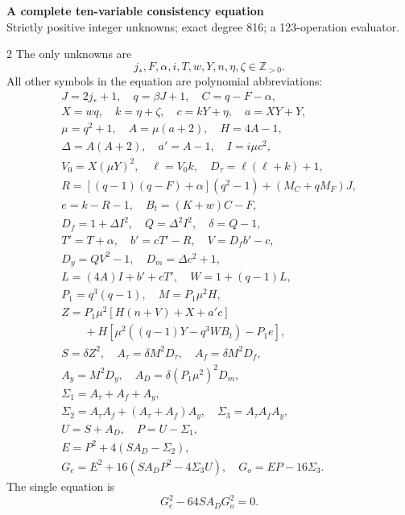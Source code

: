 \documentclass[10pt]{article}
\begin{document}
\begin{center}
{\large\bfseries A complete ten-variable consistency equation}\\[-1pt]
{\small Strictly positive integer unknowns; exact degree 816; a 123-operation evaluator.}
\end{center}\vspace{-8pt}
\begin{multicols}{2}
\fontsize{9}{9.5}\selectfont
The only unknowns are
\[
j_*,F,\alpha,i,T,w,Y,n,\eta,\zeta\in\mathbb Z_{>0}.
\]
All other symbols in the equation are polynomial abbreviations:
\[
\begin{gathered}
J=2j_*+1,\quad q=\beta J+1,\quad C=q-F-\alpha,\\
X=wq,\quad k=\eta+\zeta,\quad c=kY+\eta,\quad a=XY+Y,\\
\mu=q^2+1,\quad A=\mu(a+2),\quad H=4A-1,\\
\Delta=A(A+2),\quad a'=A-1,\quad I=i\mu c^2,\\
V_0=X(\mu Y)^2,\quad\ell=V_0k,\quad D_\tau=\ell(\ell+k)+1,\\
R=[(q-1)(q-F)+\alpha](q^2-1)+(M_C+qM_F)J,\\
e=k-R-1,\quad B_t=(K+w)C-F,\\
D_f=1+\Delta I^2,\quad Q=\Delta^2I^2,\quad\delta=Q-1,\\
T'=T+\alpha,\quad b'=cT'-R,\quad V=D_fb'-c,\\
D_y=QV^2-1,\quad D_m=\Delta c^2+1,\\
L=(4A)I+b'+cT',\quad W=1+(q-1)L,\\
P_1=q^3(q-1),\quad M=P_1\mu^2H,\\
Z=P_1\mu^2[H(n+V)+X+a'c]\\
\qquad+H[\mu^2((q-1)Y-q^3WB_t)-P_1e],\\
S=\delta Z^2,\quad A_\tau=\delta M^2D_\tau,\quad A_f=\delta M^2D_f,\\
A_y=M^2D_y,\quad A_D=\delta(P_1\mu^2)^2D_m,\\
\Sigma_1=A_\tau+A_f+A_y,\\
\Sigma_2=A_\tau A_f+(A_\tau+A_f)A_y,\quad\Sigma_3=A_\tau A_fA_y,\\
U=S+A_D,\quad P=U-\Sigma_1,\\
E=P^2+4(SA_D-\Sigma_2),\\
G_e=E^2+16(SA_DP^2-4\Sigma_3U),\quad G_o=EP-16\Sigma_3.
\end{gathered}
\]
The single equation is
\[
\boxed{G_e^2-64SA_DG_o^2=0.}
\]


\end{multicols}
\end{document}
